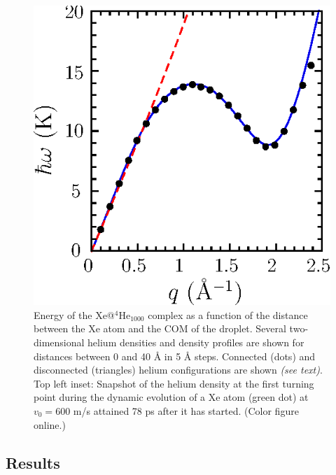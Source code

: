 			\begin{figure}[!] 
				\includegraphics[width=1.0\linewidth,clip=true]{fig1}
				\caption{ \label{fig1} Energy of the Xe@$^4$He$_{1000}$ complex as a function of the distance between  the Xe atom and the  COM of the droplet. Several two-dimensional helium densities and density profiles are shown for distances between 0 and 40 \AA{} in 5  \AA{} steps. Connected (dots) and disconnected (triangles) helium configurations are shown \emph{(see text)}. Top left inset: Snapshot of the helium density at the first turning point  during the dynamic evolution of a Xe atom (green dot) at $v_0 = 600$ m/s attained  78 ps after it has started. (Color figure online.)}
			\end{figure}

		\subsection{Results}\label{metho}

